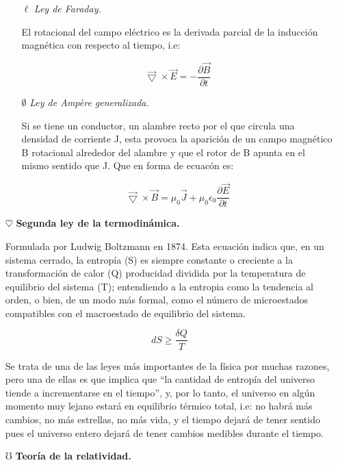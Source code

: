 \documentclass[12pt,letterpaper]{article}
\begin{document}
\begin{itemize}
\begin{itemize}
            \item[$\ell$] \textit{Ley de Faraday.}\newline

            El rotacional del campo eléctrico es la derivada parcial de la inducción magnética con respecto al tiempo, i.e:
            
            $$\vec{\bigtriangledown} \times \vec{E}=-\frac{\partial \vec{B}}{\partial t}$$
            
            \item[$\emptyset$] \textit{Ley de Ampère generalizada.}\newline

            Si se tiene un conductor, un alambre recto por el que circula una densidad de corriente J, esta provoca la aparición de un campo magnético B rotacional alrededor del alambre y que el rotor de B apunta en el mismo sentido que J. Que en forma de ecuacón es:
            
            $$\vec{\bigtriangledown} \times \vec{B}=\mu_{0}\vec{J}+\mu_{0}\epsilon_{0}\frac{\partial \vec{E}}{\partial t}$$
            
        \end{itemize}
    
    \item[$\heartsuit$] \textbf{Segunda ley de la termodinámica.}\newline
    
    Formulada por Ludwig Boltzmann en 1874. Esta ecuación indica que, en un sistema cerrado, la entropía (S) es siempre constante o creciente a la transformación de calor (Q) producidad dividida por la temperatura de equilibrio del sistema (T); entendiendo a la entropia como la tendencia al orden, o bien, de un modo más formal, como el número de microestados compatibles con el macroestado de equilibrio del sistema.
    
    $$dS\geq \frac{\delta Q}{T}$$

    Se trata de una de las leyes más importantes de la física por muchas razones, pero una de ellas es que implica que ``la cantidad de entropía del universo tiende a incrementarse en el tiempo”, y, por lo tanto, el universo en algún momento muy lejano estará en equilibrio térmico total, i.e: no habrá más cambios, no más estrellas, no más vida, y el tiempo dejará de tener sentido pues el universo entero dejará de tener cambios medibles durante el tiempo.\newline
    
    \item[$\mho$] \textbf{Teoría de la relatividad.}\newline
    

\end{itemize}
\end{document}
